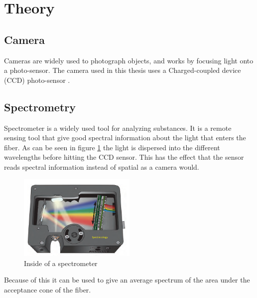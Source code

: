 \section{Theory}

\subsection{Camera}
Cameras are widely used to photograph objects, and works by focusing light onto a photo-sensor. The camera used in this thesis uses a Charged-coupled device (CCD) photo-sensor \cite{JYIVolumeThree}.

\subsection{Spectrometry}
Spectrometer is a widely used tool for analyzing substances. It is a remote sensing tool that give good spectral information about the light that enters the fiber. As can be seen in figure \ref{fig:spectrometer_inside} the light is dispersed into the different wavelengths before hitting the CCD sensor. This has the effect that the sensor reads spectral information instead of spatial as a camera would. 

\begin{figure}[h]
    \centering
    \includegraphics[width=0.5\textwidth]{figures/Mini-spectrometer-open-bench.png}
    \caption{Inside of a spectrometer \cite{KAI0340640480}}
    \label{fig:spectrometer_inside}
\end{figure}

Because of this it can be used to give an average spectrum of the area under the acceptance cone of the fiber. 

